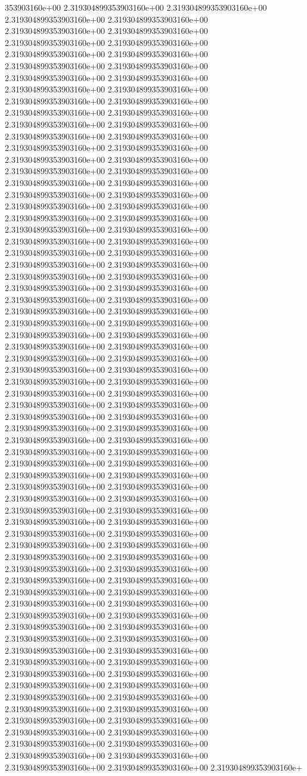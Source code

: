 353903160e+00	2.319304899353903160e+00	2.319304899353903160e+00	2.319304899353903160e+00	2.319304899353903160e+00	2.319304899353903160e+00	2.319304899353903160e+00	2.319304899353903160e+00	2.319304899353903160e+00	2.319304899353903160e+00	2.319304899353903160e+00	2.319304899353903160e+00	2.319304899353903160e+00	2.319304899353903160e+00	2.319304899353903160e+00	2.319304899353903160e+00	2.319304899353903160e+00	2.319304899353903160e+00	2.319304899353903160e+00	2.319304899353903160e+00	2.319304899353903160e+00	2.319304899353903160e+00	2.319304899353903160e+00	2.319304899353903160e+00	2.319304899353903160e+00	2.319304899353903160e+00	2.319304899353903160e+00	2.319304899353903160e+00	2.319304899353903160e+00	2.319304899353903160e+00	2.319304899353903160e+00	2.319304899353903160e+00	2.319304899353903160e+00	2.319304899353903160e+00	2.319304899353903160e+00	2.319304899353903160e+00	2.319304899353903160e+00	2.319304899353903160e+00	2.319304899353903160e+00	2.319304899353903160e+00	2.319304899353903160e+00	2.319304899353903160e+00	2.319304899353903160e+00	2.319304899353903160e+00	2.319304899353903160e+00	2.319304899353903160e+00	2.319304899353903160e+00	2.319304899353903160e+00	2.319304899353903160e+00	2.319304899353903160e+00	2.319304899353903160e+00	2.319304899353903160e+00	2.319304899353903160e+00	2.319304899353903160e+00	2.319304899353903160e+00	2.319304899353903160e+00	2.319304899353903160e+00	2.319304899353903160e+00	2.319304899353903160e+00	2.319304899353903160e+00	2.319304899353903160e+00	2.319304899353903160e+00	2.319304899353903160e+00	2.319304899353903160e+00	2.319304899353903160e+00	2.319304899353903160e+00	2.319304899353903160e+00	2.319304899353903160e+00	2.319304899353903160e+00	2.319304899353903160e+00	2.319304899353903160e+00	2.319304899353903160e+00	2.319304899353903160e+00	2.319304899353903160e+00	2.319304899353903160e+00	2.319304899353903160e+00	2.319304899353903160e+00	2.319304899353903160e+00	2.319304899353903160e+00	2.319304899353903160e+00	2.319304899353903160e+00	2.319304899353903160e+00	2.319304899353903160e+00	2.319304899353903160e+00	2.319304899353903160e+00	2.319304899353903160e+00	2.319304899353903160e+00	2.319304899353903160e+00	2.319304899353903160e+00	2.319304899353903160e+00	2.319304899353903160e+00	2.319304899353903160e+00	2.319304899353903160e+00	2.319304899353903160e+00	2.319304899353903160e+00	2.319304899353903160e+00	2.319304899353903160e+00	2.319304899353903160e+00	2.319304899353903160e+00	2.319304899353903160e+00	2.319304899353903160e+00	2.319304899353903160e+00	2.319304899353903160e+00	2.319304899353903160e+00	2.319304899353903160e+00	2.319304899353903160e+00	2.319304899353903160e+00	2.319304899353903160e+00	2.319304899353903160e+00	2.319304899353903160e+00	2.319304899353903160e+00	2.319304899353903160e+00	2.319304899353903160e+00	2.319304899353903160e+00	2.319304899353903160e+00	2.319304899353903160e+00	2.319304899353903160e+00	2.319304899353903160e+00	2.319304899353903160e+00	2.319304899353903160e+00	2.319304899353903160e+00	2.319304899353903160e+00	2.319304899353903160e+00	2.319304899353903160e+00	2.319304899353903160e+00	2.319304899353903160e+00	2.319304899353903160e+00	2.319304899353903160e+00	2.319304899353903160e+00	2.319304899353903160e+00	2.319304899353903160e+00	2.319304899353903160e+00	2.319304899353903160e+00	2.319304899353903160e+